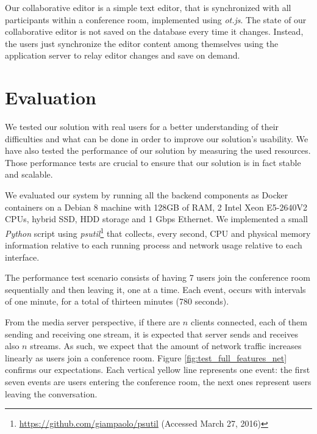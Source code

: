 \documentclass[10pt,conference]{IEEEtran}
\begin{document}
Our collaborative editor is a simple text editor, that is synchronized with all participants within a conference room, implemented using \emph{ot.js}.
The state of our collaborative editor is not saved on the database every time it changes.
Instead, the users just synchronize the editor content among themselves using the application server to relay editor changes and save on demand.















\section{Evaluation}
\label{chapter:evaluation}


We tested our solution with real users for a better understanding of their difficulties and what can be done in order to improve our solution's usability.
We have also tested the performance of our solution by measuring the used resources.
Those performance tests are crucial to ensure that our solution is in fact stable and scalable.

We evaluated our system by running all the backend components as Docker containers on a Debian 8 machine with 128GB of RAM, 2 Intel Xeon E5-2640V2 CPUs, hybrid SSD, HDD storage and 1 Gbps Ethernet. 
We implemented a small \emph{Python} script using \emph{psutil}\footnote{\url{https://github.com/giampaolo/psutil} (Accessed March 27, 2016)} that collects, every second, CPU and physical memory information relative to each running process and network usage relative to each interface. 

The performance test scenario consists of having 7 users join the conference room sequentially and then leaving it, one at a time.
Each event, occurs with intervals of one minute, for a total of thirteen minutes (780 seconds).
  
From the media server perspective, if there are $n$ clients connected, each of them sending and receiving one stream, it is expected that server sends and receives also $n$ streams.
As such, we expect that the amount of network traffic increases linearly as users join a conference room.
Figure \ref{fig:test_full_features_net} confirms our expectations.
Each vertical yellow line represents one event: the first seven events are users entering the conference room, the next ones represent users leaving the conversation. 
     
\end{document}

